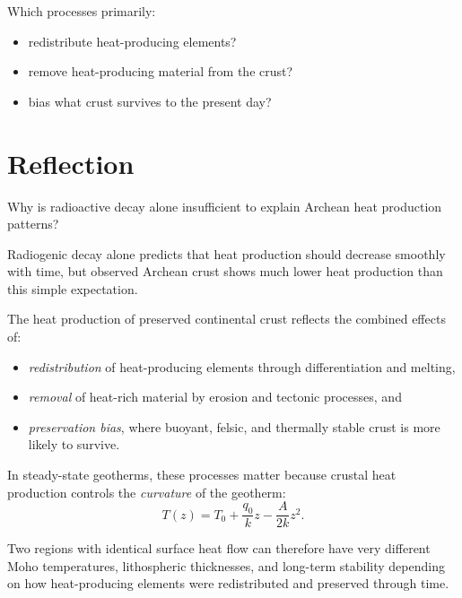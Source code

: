 \documentclass[11pt,a4paper]{article}
\begin{document}
Which processes primarily:
\begin{itemize}
  \item redistribute heat-producing elements?
  \item remove heat-producing material from the crust?
  \item bias what crust survives to the present day?
\end{itemize}


\section*{Reflection}
Why is radioactive decay alone insufficient to explain Archean heat production patterns?


{
Radiogenic decay alone predicts that heat production should decrease smoothly with time, but observed Archean crust shows much lower heat production than this simple expectation.

The heat production of preserved continental crust reflects the combined effects
of:
\begin{itemize}
  \item \emph{redistribution} of heat-producing elements through differentiation and melting,
  \item \emph{removal} of heat-rich material by erosion and tectonic processes, and
  \item \emph{preservation bias}, where buoyant, felsic, and thermally stable crust is more likely to survive.
\end{itemize}

In steady-state geotherms, these processes matter because crustal heat production controls the \emph{curvature} of the geotherm:
\[
T(z) = T_0 + \frac{q_0}{k}z - \frac{A}{2k}z^2.
\]

Two regions with identical surface heat flow can therefore have very different Moho temperatures, lithospheric thicknesses, and long-term stability depending on how heat-producing elements were redistributed and preserved through time.
}
\end{document}
